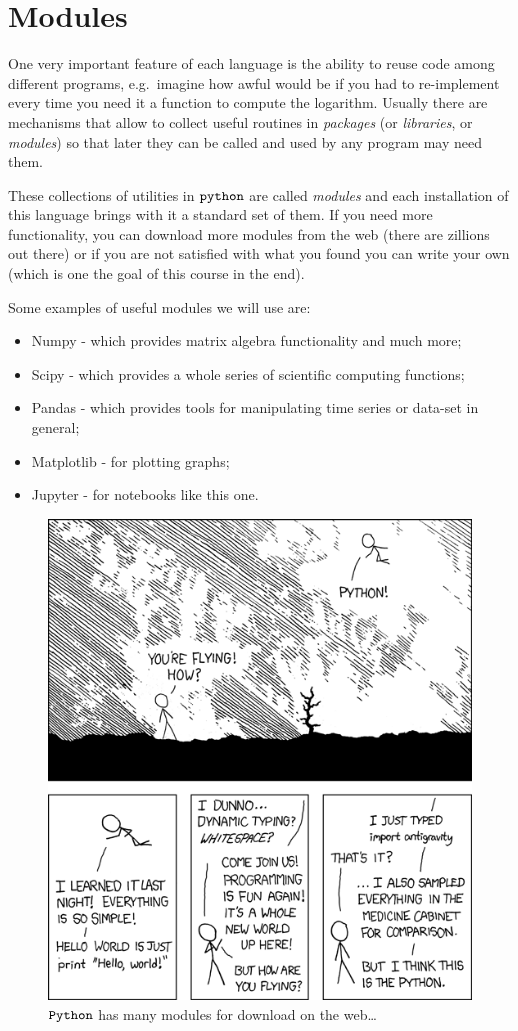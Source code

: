 \section{Modules}\label{modules}

One very important feature of each language is the ability to reuse code among different programs, e.g.~imagine how awful would be if you had to re-implement every time you need it a function to compute the logarithm.
Usually there are mechanisms that allow to collect useful routines in \emph{packages} (or \emph{libraries}, or \emph{modules}) so that later they can be called and used by any program may need them.

These collections of utilities in \(\tt{python}\) are called \emph{modules} and each installation of this language brings with it a standard set of them. If you need more functionality, you can download more modules from the web (there are zillions out there) or if you are not satisfied with what you found you can write your own (which is one the goal of this course in the end).

Some examples of useful modules we will use are:

\begin{itemize}
\tightlist
\item
  Numpy - which provides matrix algebra functionality and much more;
\item
  Scipy - which provides a whole series of scientific computing
  functions;
\item
  Pandas - which provides tools for manipulating time series or data-set
  in general;
\item
  Matplotlib - for plotting graphs;
\item
  Jupyter - for notebooks like this one.
\end{itemize}

\begin{figure}
\centering
\includegraphics[width=0.5\linewidth]{python.png}
\caption{$\tt{Python}$ has many modules for download on the web\ldots{}}
\end{figure}

